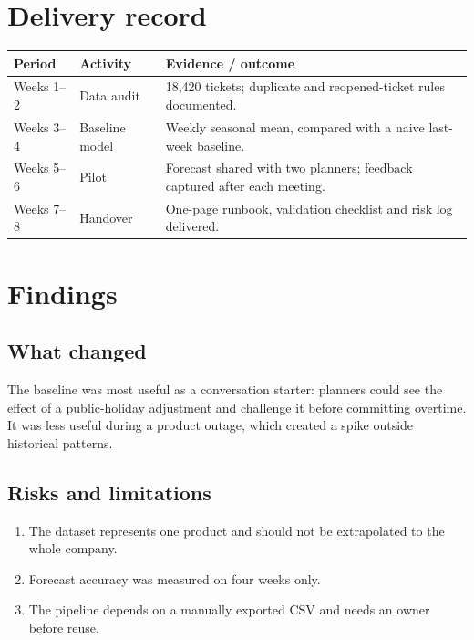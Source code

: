 \documentclass[11pt,a4paper]{report}
\begin{document}
\chapter{Delivery record}\begin{tabularx}{\textwidth}{p{}p{}X}\toprule Period & Activity & Evidence / outcome\\\midrule Weeks 1--2 & Data audit & 18,420 tickets; duplicate and reopened-ticket rules documented.\\Weeks 3--4 & Baseline model & Weekly seasonal mean, compared with a naive last-week baseline.\\Weeks 5--6 & Pilot & Forecast shared with two planners; feedback captured after each meeting.\\Weeks 7--8 & Handover & One-page runbook, validation checklist and risk log delivered.\\\bottomrule\end{tabularx}
\chapter{Findings}\section{What changed} The baseline was most useful as a conversation starter: planners could see the effect of a public-holiday adjustment and challenge it before committing overtime. It was less useful during a product outage, which created a spike outside historical patterns.\section{Risks and limitations}\begin{enumerate}[leftmargin=*]\item The dataset represents one product and should not be extrapolated to the whole company.\item Forecast accuracy was measured on four weeks only.\item The pipeline depends on a manually exported CSV and needs an owner before reuse.\end{enumerate}
\end{document}
